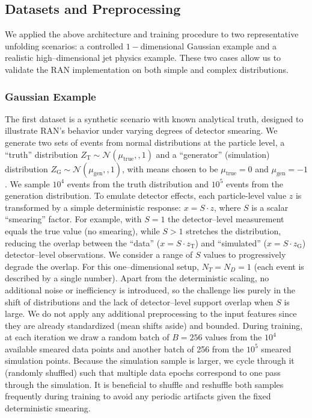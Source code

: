     \subsection{Datasets and Preprocessing}
        We applied the above architecture and training procedure to two representative unfolding scenarios: a controlled \(1-\)dimensional Gaussian example and a realistic high--dimensional jet physics example.
        These two cases allow us to validate the RAN implementation on both simple and complex distributions.

        \subsubsection{Gaussian Example}
            The first dataset is a synthetic scenario with known analytical truth, designed to illustrate RAN’s behavior under varying degrees of detector smearing.
            We generate two sets of events from normal distributions at the particle level, a “truth” distribution $Z_{\text{T}} \sim \mathcal{N}(\mu_{\text{true}},,1)$ and a “generator” (simulation) distribution $Z_{\text{G}} \sim \mathcal{N}(\mu_{\text{gen}},,1)$, with means chosen to be $\mu_{\text{true}}=0$ and $\mu_{\text{gen}}=-1$.
            We sample $10^4$ events from the truth distribution and $10^5$ events from the generation distribution.
            To emulate detector effects, each particle-level value $z$ is transformed by a simple deterministic response: $x = S \cdot z$, where $S$ is a scalar “smearing” factor.
            For example, with $S=1$ the detector--level measurement equals the true value (no smearing), while $S>1$ stretches the distribution, reducing the overlap between the “data” ($x = S\cdot z_{\text{T}}$) and “simulated” ($x = S\cdot z_{\text{G}}$) detector--level observations.
            We consider a range of $S$ values to progressively degrade the overlap.
            For this one--dimensional setup, $N_T = N_D = 1$ (each event is described by a single number).
            Apart from the deterministic scaling, no additional noise or inefficiency is introduced, so the challenge lies purely in the shift of distributions and the lack of detector--level support overlap when $S$ is large.
            We do not apply any additional preprocessing to the input features since they are already standardized (mean shifts aside) and bounded.
            During training, at each iteration we draw a random batch of $B=256$ values from the $10^4$ available smeared data points and another batch of 256 from the $10^5$ smeared simulation points.
            Because the simulation sample is larger, we cycle through it (randomly shuffled) such that multiple data epochs correspond to one pass through the simulation.
            It is beneficial to shuffle and reshuffle both samples frequently during training to avoid any periodic artifacts given the fixed deterministic smearing.
            
